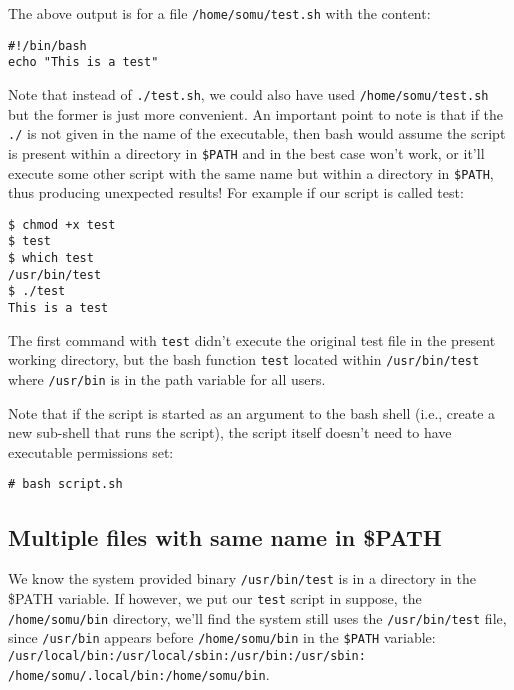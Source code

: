 \noindent
The above output is for a file \verb|/home/somu/test.sh| with the content:

\vspace{-15pt}
\begin{verbatim}
#!/bin/bash
echo "This is a test"
\end{verbatim}
\vspace{-10pt}	

\noindent
Note that instead of \verb|./test.sh|, we could also have used \verb|/home/somu/test.sh| but the former is just more convenient. An important point to note is that if the \verb|./| is not given in the name of the executable, then bash would assume the script is present within a directory in \verb|$PATH| and in the best case won't work, or it'll execute some other script with the same name but within a directory in \verb|$PATH|, thus producing unexpected results! For example if our script is called test:

\vspace{-15pt}
\begin{verbatim}
$ chmod +x test 
$ test
$ which test
/usr/bin/test
$ ./test
This is a test
\end{verbatim}
\vspace{-10pt}	

\noindent
The first command with \verb|test| didn't execute the original test file in the present working directory, but the bash function \verb|test| located within \verb|/usr/bin/test| where \verb|/usr/bin| is in the path variable for all users. 

Note that if the script is started as an argument to the bash shell (i.e., create a new sub-shell that runs the script), the script itself doesn't need to have executable permissions set:

\vspace{-15pt}
\begin{verbatim}
# bash script.sh
\end{verbatim}
\vspace{-10pt}	

\subsection{Multiple files with same name in \$PATH}	
We know the system provided binary \verb|/usr/bin/test| is in a directory in the \$PATH variable. If however, we put our \verb|test| script in suppose, the \verb|/home/somu/bin| directory, we'll find the system still uses the \verb|/usr/bin/test| file, since \verb|/usr/bin| appears before \verb|/home/somu/bin| in the \verb|$PATH| variable: \verb|/usr/local/bin:/usr/local/sbin:/usr/bin:/usr/sbin:| \\ \verb|/home/somu/.local/bin:/home/somu/bin|.

